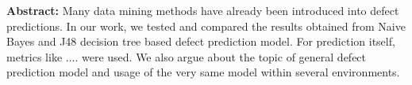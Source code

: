 \textbf{Abstract:} Many data mining methods have already been introduced into defect predictions. In our work, we tested and compared the results obtained from Naive Bayes and J48 decision tree based defect prediction model. For prediction itself, metrics like .... were used. We also argue about the topic of general defect prediction model and usage of the very same model within several environments.
